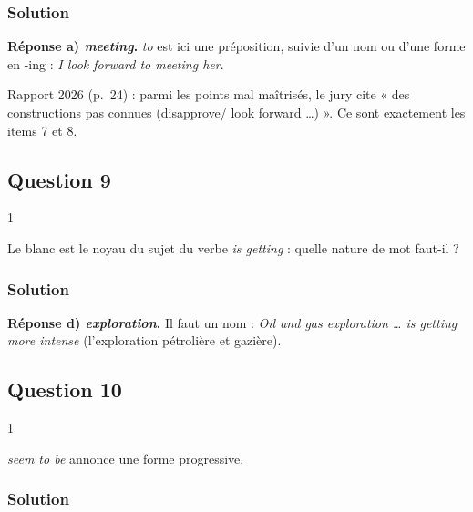 \documentclass[11pt,a4paper]{article}
\begin{document}
\hypertarget{solution-7}{%
\subsubsection{Solution}\label{solution-7}}

\textbf{Réponse a) \emph{meeting}.} \emph{to} est ici une préposition, suivie d'un nom ou d'une forme en -ing : \emph{I look forward to meeting her}.

\begin{jury}

Rapport 2026 (p.~24) : parmi les points mal maîtrisés, le jury cite « des constructions pas connues (disapprove/ look forward \ldots) ». Ce sont exactement les items 7 et 8.

\end{jury}

\hypertarget{question-9}{%
\subsection{Question 9}\label{question-9}}

\begin{indication}{1}

Le blanc est le noyau du sujet du verbe \emph{is getting} : quelle nature de mot faut-il ?

\end{indication}

\hypertarget{solution-8}{%
\subsubsection{Solution}\label{solution-8}}

\textbf{Réponse d) \emph{exploration}.} Il faut un nom : \emph{Oil and gas exploration \ldots{} is getting more intense} (l'exploration pétrolière et gazière).

\hypertarget{question-10}{%
\subsection{Question 10}\label{question-10}}

\begin{indication}{1}

\emph{seem to be} annonce une forme progressive.

\end{indication}

\hypertarget{solution-9}{%
\subsubsection{Solution}\label{solution-9}}
\end{document}
